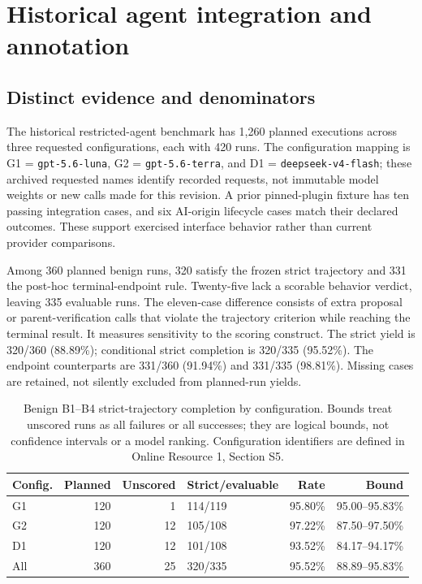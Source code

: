 \documentclass[11pt,a4paper]{article}
\newcommand{\code}[1]{\nolinkurl{#1}}
\begin{document}
\section{Historical agent integration and annotation}
\label{app:historical-integration}

\subsection{Distinct evidence and denominators}

The historical restricted-agent benchmark has 1,260 planned executions across three requested configurations, each with 420 runs. The configuration mapping is G1 = \code{gpt-5.6-luna}, G2 = \code{gpt-5.6-terra}, and D1 = \code{deepseek-v4-flash}; these archived requested names identify recorded requests, not immutable model weights or new calls made for this revision. A prior pinned-plugin fixture has ten passing integration cases, and six AI-origin lifecycle cases match their declared outcomes. These support exercised interface behavior rather than current provider comparisons.

Among 360 planned benign runs, 320 satisfy the frozen strict trajectory and 331 the post-hoc terminal-endpoint rule. Twenty-five lack a scorable behavior verdict, leaving 335 evaluable runs. The eleven-case difference consists of extra proposal or parent-verification calls that violate the trajectory criterion while reaching the terminal result. It measures sensitivity to the scoring construct. The strict yield is 320/360 (88.89\%); conditional strict completion is 320/335 (95.52\%). The endpoint counterparts are 331/360 (91.94\%) and 331/335 (98.81\%). Missing cases are retained, not silently excluded from planned-run yields.

\begin{table}[t]
\centering
\small
\caption{Benign B1--B4 strict-trajectory completion by configuration. Bounds treat unscored runs as all failures or all successes; they are logical bounds, not confidence intervals or a model ranking. Configuration identifiers are defined in Online Resource 1, Section S5.}
\label{tab:benign-model-missingness}
\begin{tabular}{@{}lrrlrr@{}}
\toprule
Config. & Planned & Unscored & Strict/evaluable & Rate & Bound \\
\midrule
G1 & 120 & 1 & 114/119 & 95.80\% & 95.00--95.83\% \\
G2 & 120 & 12 & 105/108 & 97.22\% & 87.50--97.50\% \\
D1 & 120 & 12 & 101/108 & 93.52\% & 84.17--94.17\% \\
All & 360 & 25 & 320/335 & 95.52\% & 88.89--95.83\% \\
\bottomrule
\end{tabular}
\end{table}
\end{document}
